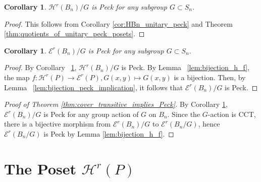 \documentclass[10 pt]{amsart}
\theoremstyle{plain}
\newtheorem{cor}[thm]{Corollary}
\theoremstyle{definition}
\theoremstyle{remark}
\numberwithin{equation}{section}
\begin{document}
\begin{cor}\label{cor:quotients_of_HBn_peck}
$\mathcal{H}^r(B_n)/G$ is Peck for any subgroup $G\subset S_n$.
\end{cor}

\begin{proof}
This follows from Corollary \ref{cor:HBn_unitary_peck} and Theorem \ref{thm:quotients_of_unitary_peck_posets}.
\end{proof}




\begin{cor}
\label{cor:quotiented_edge_peck}
$\mathcal E^r(B_n)/G$ is Peck for any subgroup $G\subset S_n$.
\end{cor}
\begin{proof}
By Corollary ~\ref{cor:quotients_of_HBn_peck}, $\mathcal H^r(B_n)/G$ is Peck. By Lemma ~\ref{lem:bijection_h_f}, the map $f:\mathcal H^r(P) \rightarrow \mathcal E^r(P),G(x, y) \mapsto G(x, y)$ is a bijection. Then, by Lemma ~\ref{lem:bijection_peck_implication}, it follows that $\mathcal E^r(B_n)/G$ is Peck.
\end{proof}

\begin{proof}[Proof of Theorem \ref{thm:cover_transitive_implies_Peck}]
By Corollary \ref{cor:quotiented_edge_peck}, $\mathcal{E}^r(B_n)/G$ is Peck for any group action of $G$ on $B_n$.  Since the $G$-action is CCT, there is a bijective morphism from $\mathcal{E}^r(B_n)/G$ to $\mathcal{E}^r(B_n/G)$, hence $\mathcal{E}^r(B_n/G)$ is Peck by Lemma \ref{lem:bijection_h_f}.
\end{proof}

\section{The Poset $\mathcal{H}^r(P)$}



\end{document}
